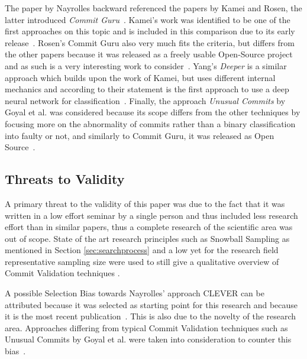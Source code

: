 The paper by Nayrolles backward referenced the papers by Kamei and Rosen, the latter introduced \textit{Commit Guru}~\cite{Nayrolles2018}. Kamei's work was identified to be one of the first approaches on this topic and is included in this comparison due to its early release~\cite{Kamei2013}. Rosen's Commit Guru also very much fits the criteria, but differs from the other papers because it was released as a freely usable Open-Source project and as such is a very interesting work to consider~\cite{Rosen2015}. Yang's \textit{Deeper} is a similar approach which builds upon the work of Kamei, but uses different internal mechanics and according to their statement is the first approach to use a deep neural network for classification~\cite{Yang2015}. Finally, the approach \textit{Unusual Commits} by Goyal et al. was considered because its scope differs from the other techniques by focusing more on the abnormality of commits rather than a binary classification into faulty or not, and similarly to Commit Guru, it was released as Open Source~\cite{Goyal2017}.

\subsection{Threats to Validity}
\label{sec:threatstovalidity}

A primary threat to the validity of this paper was due to the fact that it was written in a low effort seminar by a single person and thus included less research effort than in similar papers, thus a complete research of the scientific area was out of scope. State of the art research principles such as Snowball Sampling as mentioned in Section \ref{sec:searchprocess} and a low yet for the research field representative sampling size were used to still give a qualitative overview of Commit Validation techniques \cite{10.2307/2237615}.

A possible Selection Bias towards Nayrolles' approach CLEVER can be attributed because it was selected as starting point for this research and because it is the most recent publication~\cite{Nayrolles2018}. This is also due to the novelty of the research area. Approaches differing from typical Commit Validation techniques such as Unusual Commits by Goyal et al. were taken into consideration to counter this bias~\cite{Goyal2017}.

